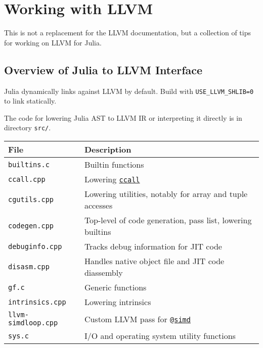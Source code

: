 \hypertarget{5125896206531208336}{}


\section{Working with LLVM}



This is not a replacement for the LLVM documentation, but a collection of tips for working on LLVM for Julia.



\hypertarget{8956364453365125987}{}


\subsection{Overview of Julia to LLVM Interface}



Julia dynamically links against LLVM by default. Build with \texttt{USE\_LLVM\_SHLIB=0} to link statically.



The code for lowering Julia AST to LLVM IR or interpreting it directly is in directory \texttt{src/}.




\begin{table}[h]

\begin{tabulary}{\linewidth}{|L|L|}
\hline
File & Description \\
\hline
\texttt{builtins.c} & Builtin functions \\
\hline
\texttt{ccall.cpp} & Lowering \hyperlink{14245046751182637566}{\texttt{ccall}} \\
\hline
\texttt{cgutils.cpp} & Lowering utilities, notably for array and tuple accesses \\
\hline
\texttt{codegen.cpp} & Top-level of code generation, pass list, lowering builtins \\
\hline
\texttt{debuginfo.cpp} & Tracks debug information for JIT code \\
\hline
\texttt{disasm.cpp} & Handles native object file and JIT code diassembly \\
\hline
\texttt{gf.c} & Generic functions \\
\hline
\texttt{intrinsics.cpp} & Lowering intrinsics \\
\hline
\texttt{llvm-simdloop.cpp} & Custom LLVM pass for \hyperlink{8155428559748374852}{\texttt{@simd}} \\
\hline
\texttt{sys.c} & I/O and operating system utility functions \\
\hline
\end{tabulary}

\end{table}



